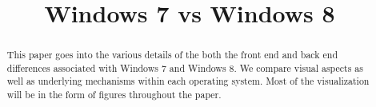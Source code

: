 \documentclass[conference]{IEEEtran}
\begin{document}
\title{Windows 7 vs Windows 8}

\author{
}
%
%
%


\maketitle


\begin{abstract}
This paper goes into the various details of the both the front end and back end differences associated with Windows 7 
and Windows 8. We compare visual aspects as well as underlying mechanisms within each operating system. Most of the visualization
will be in the form of figures throughout the paper.
\end{abstract}
\end{document}
